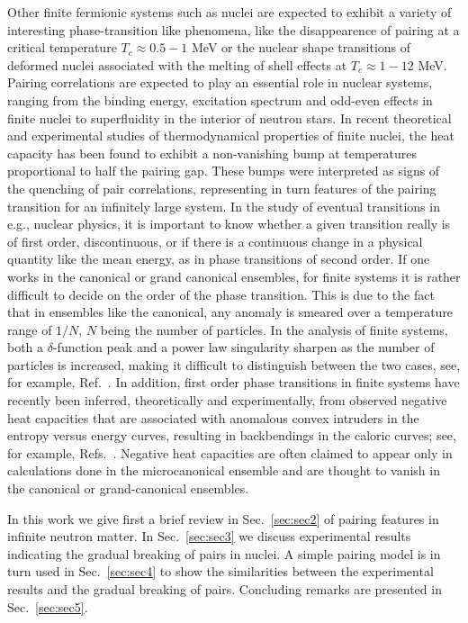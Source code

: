 \documentclass{elsart}
\begin{document}
Other finite fermionic systems such as   
nuclei are expected to
exhibit a variety of interesting phase-transition like phenomena, like
the disappearence of pairing at a critical temperature $T_c\approx
0.5-1$ MeV or the nuclear shape transitions of deformed nuclei
associated with the melting of shell effects at  
$T_c\approx 1-12$ MeV.  
Pairing correlations are expected 
to play an essential role in nuclear systems, ranging 
from the binding energy, excitation spectrum and odd-even effects
in finite nuclei to superfluidity in the interior of neutron stars.
In recent theoretical and experimental studies \cite{yoram2000,andreas2000}
of thermodynamical properties of finite nuclei, the heat capacity 
has been found to exhibit a non-vanishing bump at temperatures proportional to
half the pairing gap. These bumps were interpreted as  signs of the 
quenching of pair correlations, representing in turn features
of the pairing transition for an infinitely large system. 
In the study of eventual 
transitions in e.g., nuclear physics, it is important to know  whether
a given transition really is of first order, discontinuous, 
or if there is a continuous change
in a physical quantity like the mean energy, as in phase transitions
of second order. If one works in the canonical or grand canonical
ensembles, for finite systems
it is rather difficult to decide on the order of the phase
transition. This is due to the fact that in ensembles like the canonical,
any anomaly is smeared over a temperature range of $1/N$, $N$ being the
number of particles. In the analysis of  finite systems, both a 
$\delta$-function peak and a power law singularity sharpen as the
number of particles is increased, making it difficult to distinguish
between the two cases, see, for example, Ref.~\cite{huller}. 
In addition, first order phase transitions in finite systems 
have recently been inferred, theoretically and experimentally,  from 
observed negative heat capacities that 
are associated with anomalous convex intruders in the entropy
versus energy curves, resulting in backbendings in the caloric 
curves; see, for example, 
Refs.~\cite{andreas2000,huller,gross,schmidt01,agostino00,gc00}.
Negative heat capacities are often claimed to appear only in calculations
done in the microcanonical ensemble and are thought to vanish 
in the canonical or grand-canonical ensembles. 

In this work we give first a brief review in Sec.~\ref{sec:sec2} 
of pairing features in
infinite neutron matter. In Sec.~\ref{sec:sec3} we discuss experimental results
indicating the gradual breaking of pairs in nuclei. A simple pairing model
is in turn used in Sec.~\ref{sec:sec4} 
to show the similarities between the experimental results and
the gradual breaking of pairs.
Concluding remarks are presented in Sec.~\ref{sec:sec5}.
\end{document}
